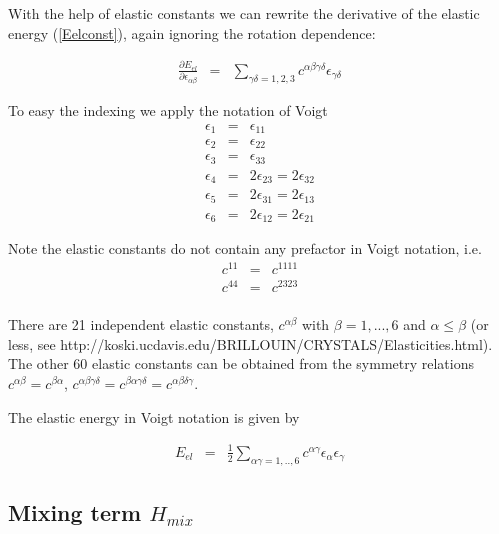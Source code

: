 With the help of elastic constants we can rewrite the derivative of the elastic energy
(\ref{Eelconst}), again ignoring the rotation dependence:

\begin{eqnarray}\label{Eelderivelconst}
\frac{\partial E_{el}}{\partial \epsilon_{\alpha\beta}}&=&
\sum_{\gamma\delta=1,2,3} c^{\alpha\beta\gamma\delta} \epsilon_{\gamma\delta}
\end{eqnarray}




To easy the indexing we apply the notation of Voigt
\begin{eqnarray}\label{voigt}
\epsilon_1&=&\epsilon_{11}  \\
\epsilon_2&=&\epsilon_{22} \nonumber \\
\epsilon_3&=&\epsilon_{33}\nonumber \\
\epsilon_4&=&2\epsilon_{23}=2\epsilon_{32}\nonumber \\
\epsilon_5&=&2\epsilon_{31}=2\epsilon_{13}\nonumber \\
\epsilon_6&=&2\epsilon_{12}=2\epsilon_{21} \nonumber
\end{eqnarray}

Note the elastic constants do not contain any prefactor in Voigt notation, i.e.
\begin{eqnarray}\label{voigtel}
c^{11}&=&c^{1111} \\
c^{44}&=&c^{2323} \nonumber \\
\end{eqnarray}

There are 21 independent elastic constants, $c^{\alpha\beta}$ with $\beta=1,...,6$ and
$\alpha \le \beta$ (or less, see  http://koski.ucdavis.edu/BRILLOUIN/CRYSTALS/Elasticities.html). The other 60 elastic constants 
can be obtained from the symmetry relations $c^{\alpha\beta}=c^{\beta\alpha}$, 
$c^{\alpha\beta\gamma\delta}=c^{\beta\alpha\gamma\delta}=c^{\alpha\beta\delta\gamma}$.

The elastic energy in Voigt notation is given by

\begin{eqnarray}\label{Eelconstvoigt}
E_{el} &=& \frac{1}{2}\sum_{\alpha\gamma=1,..,6} c^{\alpha\gamma} \epsilon_{\alpha}\epsilon_{\gamma}
\end{eqnarray}

\subsection{Mixing term $H_{mix}$}

